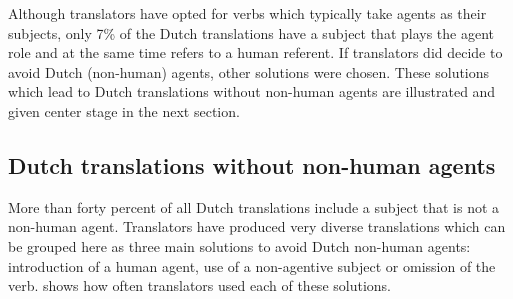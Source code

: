 \documentclass[output=paper]{LSP/langsci}
\begin{document}


Although translators have opted for verbs which typically take agents as their subjects, only 7\% of the Dutch translations have a subject that plays the agent role and at the same time refers to a human referent. If translators did decide to avoid Dutch (non-human) agents, other solutions were chosen. These solutions which lead to Dutch translations without non-human agents are illustrated and given center stage in the next section.  

\subsection{Dutch translations without non-human agents} \label{sec:5:6:2}
More than forty percent of all Dutch translations include a subject that is not a non-human agent. Translators have produced very diverse translations which can be grouped here as three main solutions to avoid Dutch non-human agents: introduction of a human agent, use of a non-agentive subject or omission of the verb.  shows how often translators used each of these solutions. 

\begin{table}
     \centering
     \caption{Solutions used to avoid NL non-human agents}
     \label{tab:5:3}
 
   \end{table}
\end{document}
